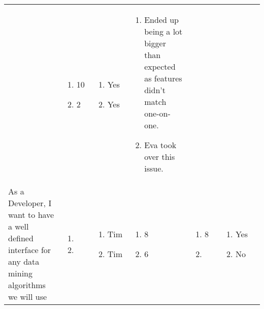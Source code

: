 \documentclass[11pt,a4paper,landscape]{article}
\begin{document}
\begin{table}[h]
\begin{tabular}{|p{5cm}|p{1.0cm}|p{2.5cm}|p{1.8cm}|p{1.8cm}|p{1.0cm}|p{12cm}}
& \begin{enumerate}[leftmargin=0.1cm,itemindent=0.1cm]
\item[] 10 
\item[] 2 
\end{enumerate}

& \begin{enumerate}[leftmargin=0.1cm,itemindent=0.1cm]
\item[] Yes
\item[] Yes
\end{enumerate}

& \begin{enumerate}[leftmargin=0.5cm,itemindent=0.1cm]
\item Ended up being a lot bigger than expected as features didn't match one-on-one.
\item Eva took over this issue.
\end{enumerate}

 \\

As a Developer, I want to have a well defined interface for any data mining algorithms we will use & \begin{enumerate}[leftmargin=0.3cm,itemindent=0.1cm]
\item 
\item
\end{enumerate}

& 
\begin{enumerate}[leftmargin=0.1cm,itemindent=0.1cm]
\item[] Tim
\item[] Tim
\end{enumerate}

& 
\begin{enumerate}[leftmargin=0.1cm,itemindent=0.1cm]
\item[] 8 
\item[] 6 
\end{enumerate}

&
\begin{enumerate}[leftmargin=0.1cm,itemindent=0.1cm]
\item[] 8 
\item[]
\end{enumerate}

&
\begin{enumerate}[leftmargin=0.1cm,itemindent=0.1cm]
\item[] Yes
\item[] No
\end{enumerate}


\end{tabular}
\end{table}
\end{document}
